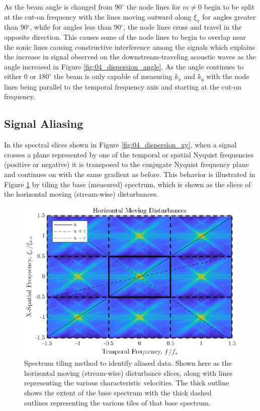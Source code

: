 As the beam angle is changed from $90^\circ$ the node lines for $m\neq0$ begin to be split at the cut-on frequency with the lines moving outward along $\xi_x$ for angles greater than 90$^\circ$, while for angles less than 90$^\circ$, the node lines cross and travel in the opposite direction.
This causes some of the node lines to begin to overlap near the sonic lines causing constructive interference among the signals which explains the increase in signal observed on the downstream-traveling acoustic waves as the angle increased in Figure \ref{fig:04_dispersion_angle}.
As the angle continues to either 0 or $180^\circ$ the beam is only capable of measuring $k_x$ and $k_y$ with the node lines being parallel to the temporal frequency axis and starting at the cut-on frequency.

\subsection{Signal Aliasing}
In the spectral slices shown in Figure \ref{fig:04_dispersion_xy}, when a signal crosses a plane represented by one of the temporal or spatial Nyquist frequencies (positive or negative) it is transposed to the conjugate Nyquist frequency plane and continues on with the same gradient as before.
This behavior is illustrated in Figure \ref{fig:04_dispersion_tiling} by tiling the base (measured) spectrum, which is shown as the slices of the horizontal moving (stream-wise) disturbances.
\begin{figure}
  \centering
  \includegraphics{../matlab/04_dispersion_analysis/dispersion_tiling.eps}
  \caption{Spectrum tiling method to identify aliased data. Shown here as the horizontal moving (stream-wise) disturbance slices, along with lines representing the various characteristic velocities. The thick outline shows the extent of the base spectrum with the thick dashed outlines representing the various tiles of that base spectrum.}
  \label{fig:04_dispersion_tiling}
\end{figure}
